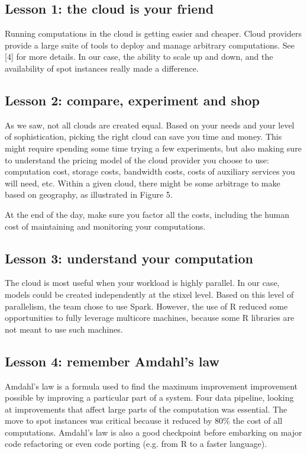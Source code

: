 \documentclass{acm_proc_article-sp}
\begin{document}
\subsection*{Lesson 1: the cloud is your friend}
Running computations in the cloud is getting easier and cheaper. Cloud providers provide a large suite of tools to deploy and manage arbitrary computations. See [4] for more details. In our case, the ability to scale up and down, and the availability of spot instances really made a difference.
 
\subsection*{Lesson 2: compare, experiment and shop}
As we saw, not all clouds are created equal. Based on your needs and your level of sophistication, picking the right cloud can save you time and money. This might require spending some time trying a few experiments, but also making sure to understand  the pricing model of the cloud provider you choose to use: computation cost, storage costs, bandwidth costs, costs of auxiliary services you will need, etc. Within a given cloud, there might be some arbitrage to make based on geography, as illustrated in Figure 5.

At the end of the day, make sure you factor all the costs, including the human cost of maintaining and monitoring your computations.

\subsection*{Lesson 3: understand your computation}
The cloud is most useful when your workload is highly parallel. In our case, models could be created independently at the stixel level. Based on this level of parallelism, the team chose to use Spark. However, the use of R reduced some opportunities to fully leverage multicore machines, because some R libraries are not meant to use such machines.

\subsection*{Lesson 4: remember Amdahl's law}
Amdahl's law is a formula used to find the maximum improvement improvement possible by improving a particular part of a system. Four data pipeline, looking at improvements that affect large parts of the computation was essential. The move to spot instances was critical because it reduced by 80\% the cost of all computations. Amdahl's law is also a good checkpoint before embarking on  major code refactoring or even code porting (e.g. from R to a faster language). 
\end{document}
